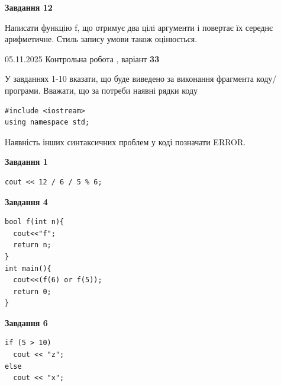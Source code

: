 \documentclass[12pt, ukrainian]{article}
\begin{document}
{\begin {large}
\begin{minipage}[t]{11.0cm}
\begin{center}
\textbf{Завдання 12}
\end{center}

Написати функцiю f, що отримує два цiлi аргументи i повертає їх середнє арифметичне. Стиль запису умови також оцінюється.\par

\end{minipage}

\end {large}}
\newpage

{\Large{05.11.2025 Контрольна робота , варіант  \No \textbf { 33 }\par}}
{
\begin {large}
У завданнях 1-10 вказати, що буде виведено за виконання фрагмента коду/про\-гра\-ми.
Вважати, що за потреби наявні рядки коду
\begin{verbatim}
#include <iostream>
using namespace std;
\end{verbatim}
Наявність інших синтаксичних проблем у коді позначати ERROR.

\begin{minipage}[t]{7.0cm}

\begin{center}
\textbf{Завдання 1}
\end{center}
\vspace{-8mm}

\begin{verbatim}
cout << 12 / 6 / 5 % 6;
\end{verbatim}



\begin{center}
\textbf{Завдання 4}
\end{center}
\vspace{-8mm}

\begin{verbatim}
bool f(int n){
  cout<<"f";
  return n;
}
int main(){
  cout<<(f(6) or f(5));
  return 0;
}
\end{verbatim}



\begin{center}
\textbf{Завдання 6}
\end{center}
\vspace{-8mm}

\begin{verbatim}
if (5 > 10)
  cout << "z";
else
  cout << "x";
\end{verbatim}




\end{minipage}
\end{large}}
\end{document}
